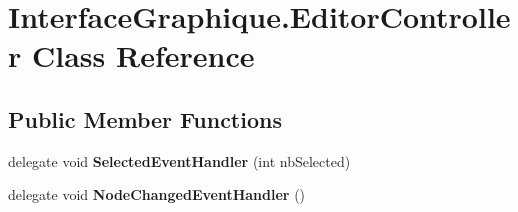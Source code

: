 \hypertarget{class_interface_graphique_1_1_editor_controller}{}\section{Interface\+Graphique.\+Editor\+Controller Class Reference}
\label{class_interface_graphique_1_1_editor_controller}
\subsection*{Public Member Functions}
\begin{DoxyCompactItemize}
\item 
\hypertarget{class_interface_graphique_1_1_editor_controller_a5dd318fe9ffbc3d4a9515a3c50799f90}{}delegate void {\bfseries Selected\+Event\+Handler} (int nb\+Selected)\label{class_interface_graphique_1_1_editor_controller_a5dd318fe9ffbc3d4a9515a3c50799f90}

\item 
\hypertarget{class_interface_graphique_1_1_editor_controller_aeac82bbe20161320c61ad3d6f6c09439}{}delegate void {\bfseries Node\+Changed\+Event\+Handler} ()\label{class_interface_graphique_1_1_editor_controller_aeac82bbe20161320c61ad3d6f6c09439}


\end{DoxyCompactItemize}
